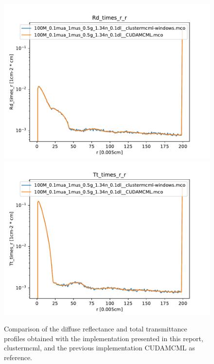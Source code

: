 \documentclass[]{article}
\begin{document}
\begin{figure}[ht!]
	\includegraphics[width=\linewidth]{img/verification1.pdf}
	\includegraphics[width=\linewidth]{img/verification2.pdf}
	\caption{Comparison of the diffuse reflectance and total transmittance profiles obtained with the implementation presented in this report, clustermcml, and the previous implementation CUDAMCML as reference.}
	\label{verification1}
\end{figure}
\end{document}
